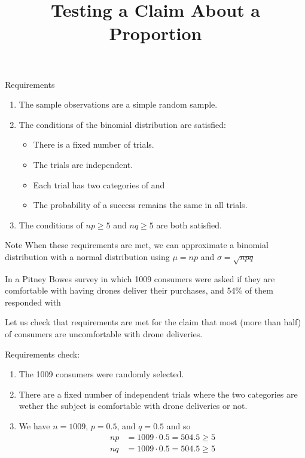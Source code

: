 \documentclass{beamer}
\title[MA205 - Section 8.2]{Testing a Claim About a Proportion}
\begin{document}
\begin{frame}
\titlepage
\end{frame}

\begin{frame}
\begin{block}{Requirements}
\begin{enumerate}
\item The sample observations are a simple random sample.\pause
\item The conditions of the binomial distribution are satisfied:
\begin{itemize}
\item There is a fixed number of trials.
\item The trials are independent.
\item Each trial has two categories of  and 
\item The probability of a success remains the same in all trials.
\end{itemize}\pause
\item The conditions of $np\geq 5$ and $nq\geq 5$ are both satisfied.
\end{enumerate}
\end{block}\pause

\begin{block}{Note}
When these requirements are met, we can approximate a binomial distribution with a normal distribution using $\mu=np$ and $\sigma=\sqrt{npq}$
\end{block}
\end{frame}

\begin{frame}
\begin{example}\label{exp_drones}
In a Pitney Bowes survey in which 1009 consumers were asked if they are comfortable with having drones deliver their purchases, and 54\% of them responded with \pause

\vspace{1mm}
Let us check that requirements are met for the claim that most (more than half) of consumers are uncomfortable with drone deliveries.\pause

\vspace{1mm}
Requirements check:
\begin{enumerate}
\item The 1009 consumers were randomly selected.\pause
\item There are a fixed number of independent trials where the two categories are wether the subject is comfortable with drone deliveries or not.\pause
\item We have $n=1009$, $p=0.5$, and $q=0.5$ and so
\begin{equation*}
\begin{aligned}
np&=1009\cdot 0.5 = 504.5\geq 5 \\
nq&=1009\cdot 0.5 = 504.5\geq 5
\end{aligned}
\end{equation*}
\end{enumerate}
\end{example}
\end{frame}
\end{document}
